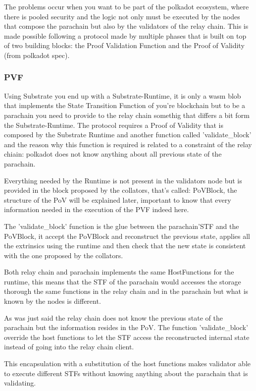 \documentclass[../main.tex]{subfiles}
\begin{document}
The problems occur when you want to be part of the polkadot ecosystem, where there is pooled security and the logic not only must be executed by the nodes that compose the parachain but also by the validators of the relay chain. This is made possible following a protocol made by multiple phases that is built on top of two building blocks: the Proof Validation Function and the Proof of Validity
(from polkadot spec).

\subsubsection{PVF}

Using Substrate you end up with a Substrate-Runtime, it is only a wasm blob that implements the State Transition Function of you're blockchain but to be a parachain you need to provide to the relay chain somethig that differs a bit form the Substrate-Runtime.
The protocol requires a Proof of Validity that is composed by the Substrate Runtime and another function called 'validate\_block' and the reason why this function is required is related to a constraint of the relay chiain: polkadot does not know anything about all previous state of the parachain.

Everything needed by the Runtime is not present in the validators node but is provided in the block proposed by the collators, that's called: PoVBlock, the structure of the PoV will be explained later, important to know that every information needed in the execution of the PVF indeed here.

The 'validate\_block' function is the glue between the parachain'STF and the PoVBlock, it accept the PoVBlock and reconstruct the previous state, applies all the extrinsics using the runtime and then check that the new state is consistent with the one proposed by the collators.

Both relay chain and parachain implements the same HostFunctions for the runtime, this means that the STF of the parachain would accesses the storage thorough the same functions in the relay chain and in the parachain but what is known by the nodes is different.

As was just said the relay chain does not know the previous state of the parachain but the information resides in the PoV. The function 'validate\_block' override the host functions to let the STF access the reconstructed internal state instead of going into the relay chain client.

This encapsulation with a substitution of the host functions makes  validator able to execute different STFs without knowing anything about the parachain that is validating.
\end{document}

